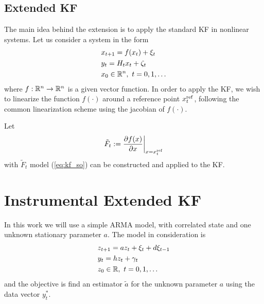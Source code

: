 \subsection{Extended KF}
The main idea behind the extension is to apply the standard KF in nonlinear systems. Let us consider a system in the form
\begin{equation}
  \begin{split}
    &x_{t+1}=f(x_t) + \xi_t\\
    &y_t=H_tx_t+\zeta_t\\
    &x_0\in{\mathbb{R}}^n, \ t=0,1,\dots
  \end{split}
\end{equation}
where $f:{\mathbb{R}}^n\rightarrow{\mathbb{R}}^n$ is a given vector function. In order to apply the KF, we wish to linearize the function $f(\cdot)$ around a reference point $x^{{\rm ref}}_t$, following the common linearization scheme using the jacobian of $f(\cdot)$.

Let
\[
\tilde{F}_t:=\dfrac{\partial f(x)}{\partial x}\bigg|_{x=x^{{\rm ref}}_t}
\]
with $\tilde{F}_t$ model (\ref{eq:kf_so}) can be constructed and applied to the KF.


\section{Instrumental Extended KF}\label{sec:IEKF}
In this work we will use a simple ARMA model, with correlated state and one unknown stationary parameter $a$. The model in consideration is
\begin{equation}
  \begin{split}
    &z_{t+1}=az_t+\xi_t+d\xi_{t-1}\\
    &y_{t}=hz_t+\gamma_{t}\\
    &z_0\in{\mathbb{R}}, \ t=0,1,\dots
  \end{split}
\end{equation}
and the objective is find an estimator $\tilde{a}$ for the unknown parameter $a$ using the data vector $y^*_t$.

